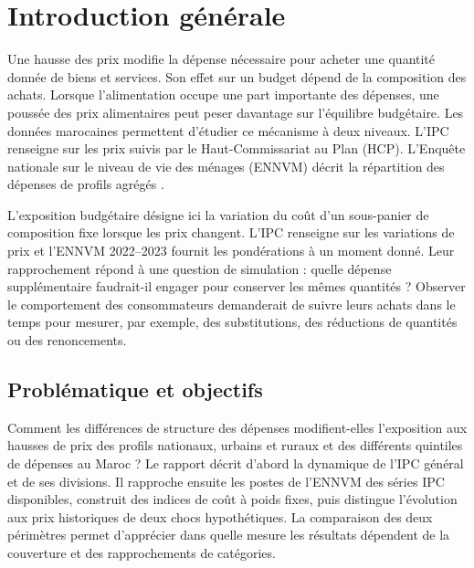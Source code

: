 \chapter*{Introduction générale}
Une hausse des prix modifie la dépense nécessaire pour acheter une quantité donnée de biens et services. Son effet sur un budget dépend de la composition des achats. Lorsque l'alimentation occupe une part importante des dépenses, une poussée des prix alimentaires peut peser davantage sur l'équilibre budgétaire. Les données marocaines permettent d'étudier ce mécanisme à deux niveaux. L'IPC renseigne sur les prix suivis par le Haut-Commissariat au Plan (HCP). L'Enquête nationale sur le niveau de vie des ménages (ENNVM) décrit la répartition des dépenses de profils agrégés \cite{hcpIPC,hcpENNVM}.

L'exposition budgétaire désigne ici la variation du coût d'un sous-panier de composition fixe lorsque les prix changent. L'IPC renseigne sur les variations de prix et l'ENNVM 2022--2023 fournit les pondérations à un moment donné. Leur rapprochement répond à une question de simulation : quelle dépense supplémentaire faudrait-il engager pour conserver les mêmes quantités ? Observer le comportement des consommateurs demanderait de suivre leurs achats dans le temps pour mesurer, par exemple, des substitutions, des réductions de quantités ou des renoncements.

\section*{Problématique et objectifs}
Comment les différences de structure des dépenses modifient-elles l'exposition aux hausses de prix des profils nationaux, urbains et ruraux et des différents quintiles de dépenses au Maroc ? Le rapport décrit d'abord la dynamique de l'IPC général et de ses divisions. Il rapproche ensuite les postes de l'ENNVM des séries IPC disponibles, construit des indices de coût à poids fixes, puis distingue l'évolution aux prix historiques de deux chocs hypothétiques. La comparaison des deux périmètres permet d'apprécier dans quelle mesure les résultats dépendent de la couverture et des rapprochements de catégories.

